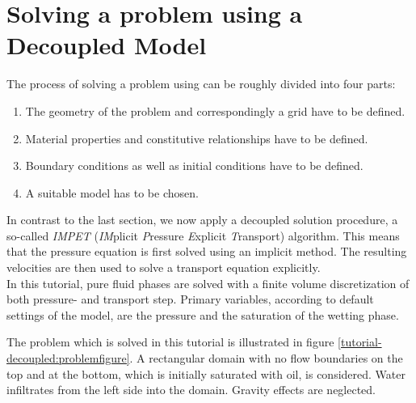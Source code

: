 \section[Decoupled model]{Solving a problem using a Decoupled Model}\label{tutorial-decoupled}
The process of solving a problem using \Dumux can be roughly divided into four parts:
\begin{enumerate}
 \item The geometry of the problem and correspondingly a grid have to be defined.
 \item Material properties and constitutive relationships have to be defined.
 \item Boundary conditions as well as initial conditions have to be defined.
 \item A suitable model has to be chosen.
\end{enumerate}

In contrast to the last section, we now apply a decoupled solution procedure, a
so-called \textit{IMPET} (\textit{IM}plicit \textit{P}ressure \textit{E}xplicit
\textit{T}ransport) algorithm. This means that the pressure equation is first
solved using an implicit method. The resulting velocities are then used to solve
a transport equation explicitly.\\
In this tutorial, pure fluid phases are solved with a finite volume discretization
of both pressure- and transport step. Primary variables, according to default
settings of the model, are the pressure and the saturation of the wetting phase.

The problem which is solved in this tutorial is illustrated in figure
\ref{tutorial-decoupled:problemfigure}. A rectangular domain with no flow
boundaries on the top and at the bottom, which is initially saturated with oil,
is considered. Water infiltrates from the left side into the domain. Gravity
effects are neglected.


